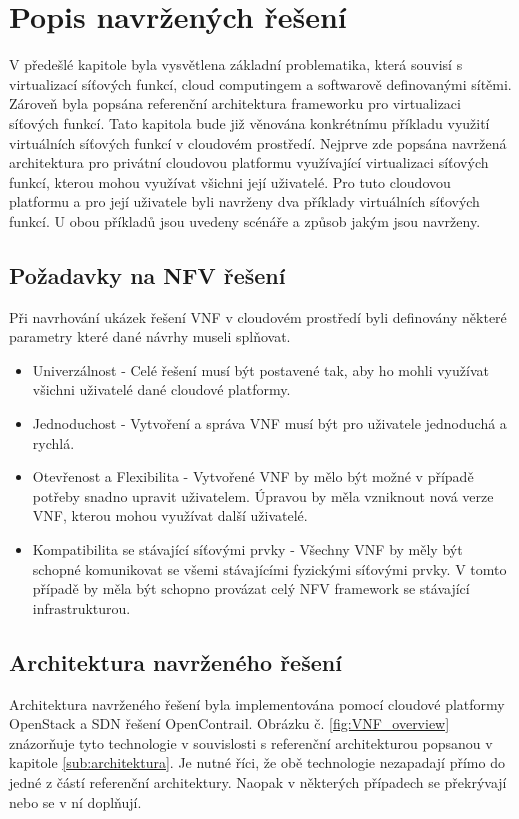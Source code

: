 \chapter{Popis navržených řešení}

V předešlé kapitole byla vysvětlena základní problematika, která souvisí s virtualizací síťových funkcí, cloud computingem a softwarově definovanými sítěmi. Zároveň byla popsána referenční architektura frameworku pro virtualizaci síťových funkcí. Tato kapitola bude již věnována konkrétnímu příkladu využití virtuálních síťových funkcí v cloudovém prostředí. Nejprve zde popsána navržená architektura pro privátní cloudovou platformu využívající virtualizaci síťových funkcí, kterou mohou využívat všichni její uživatelé. Pro tuto cloudovou platformu a pro její uživatele byli navrženy dva příklady virtuálních síťových funkcí. U obou příkladů jsou uvedeny scénáře a způsob jakým jsou navrženy.

\section{Požadavky na NFV řešení}

Při navrhování ukázek řešení VNF v cloudovém prostředí byli definovány některé parametry které dané návrhy museli splňovat.

\begin{itemize}
\item Univerzálnost - Celé řešení musí být postavené tak, aby ho mohli využívat všichni uživatelé dané cloudové platformy. 
\item Jednoduchost - Vytvoření a správa VNF musí být pro uživatele jednoduchá a rychlá.
\item Otevřenost a Flexibilita - Vytvořené VNF by mělo být možné v případě potřeby snadno upravit uživatelem. Úpravou by měla vzniknout nová verze VNF, kterou mohou využívat další uživatelé.  
\item Kompatibilita se stávající síťovými prvky - Všechny VNF by měly být schopné komunikovat se všemi stávajícími fyzickými síťovými prvky. V tomto případě by měla být schopno provázat celý NFV framework se stávající infrastrukturou.
\end{itemize}

\section{Architektura navrženého řešení}

Architektura navrženého řešení byla implementována pomocí cloudové platformy OpenStack a SDN řešení OpenContrail. Obrázku č. \ref{fig:VNF_overview} znázorňuje tyto technologie v souvislosti s referenční architekturou popsanou v kapitole \ref{sub:architektura}. Je nutné říci, že obě technologie nezapadají přímo do jedné z částí referenční architektury. Naopak v některých případech se překrývají nebo se v ní doplňují.

